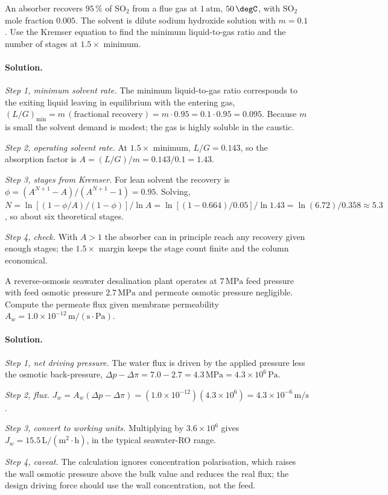 \begin{exercise}
An absorber recovers $95\,\%$ of $\text{SO}_2$ from a flue gas at
$1\,\text{atm}$, $50\,\degC$, with $\text{SO}_2$ mole fraction
$0.005$. The solvent is dilute sodium hydroxide solution with $m =
0.1$. Use the Kremser equation to find the minimum liquid-to-gas
ratio and the number of stages at $1.5 \times$ minimum.

\paragraph{Solution.}
\textit{Step 1, minimum solvent rate.} The minimum liquid-to-gas ratio
corresponds to the exiting liquid leaving in equilibrium with the
entering gas, $(L/G)_{\min} = m\,(\text{fractional recovery}) = m\cdot
0.95 = 0.1\cdot 0.95 = 0.095$. Because $m$ is small the solvent demand
is modest; the gas is highly soluble in the caustic.

\textit{Step 2, operating solvent rate.} At $1.5\times$ minimum,
$L/G = 0.143$, so the absorption factor is $A = (L/G)/m = 0.143/0.1 =
1.43$.

\textit{Step 3, stages from Kremser.} For lean solvent the recovery is
$\phi = (A^{N+1}-A)/(A^{N+1}-1) = 0.95$. Solving,
$N = \ln[(1-\phi/A)/(1-\phi)]/\ln A =
\ln[(1-0.664)/0.05]/\ln 1.43 = \ln(6.72)/0.358 \approx 5.3$,
so about six theoretical stages.

\textit{Step 4, check.} With $A>1$ the absorber can in principle reach
any recovery given enough stages; the $1.5\times$ margin keeps the
stage count finite and the column economical.
\end{exercise}

\begin{exercise}
A reverse-osmosis seawater desalination plant operates at $7\,\text{MPa}$
feed pressure with feed osmotic pressure $2.7\,\text{MPa}$ and
permeate osmotic pressure negligible. Compute the permeate flux given
membrane permeability $A_w = 1.0 \times 10^{-12}\,\text{m}/(\text{s}
\cdot\text{Pa})$.

\paragraph{Solution.}
\textit{Step 1, net driving pressure.} The water flux is driven by the
applied pressure less the osmotic back-pressure, $\Delta p - \Delta\pi
= 7.0 - 2.7 = 4.3\,\text{MPa} = 4.3\times 10^{6}\,\text{Pa}$.

\textit{Step 2, flux.} $J_w = A_w(\Delta p - \Delta\pi) =
(1.0\times 10^{-12})(4.3\times 10^{6}) = 4.3\times 10^{-6}\,\text{m/s}$.

\textit{Step 3, convert to working units.} Multiplying by $3.6\times
10^{6}$ gives $J_w = 15.5\,\text{L}/(\text{m}^2\cdot\text{h})$, in the
typical seawater-RO range.

\textit{Step 4, caveat.} The calculation ignores concentration
polarisation, which raises the wall osmotic pressure above the bulk
value and reduces the real flux; the design driving force should use
the wall concentration, not the feed.
\end{exercise}


